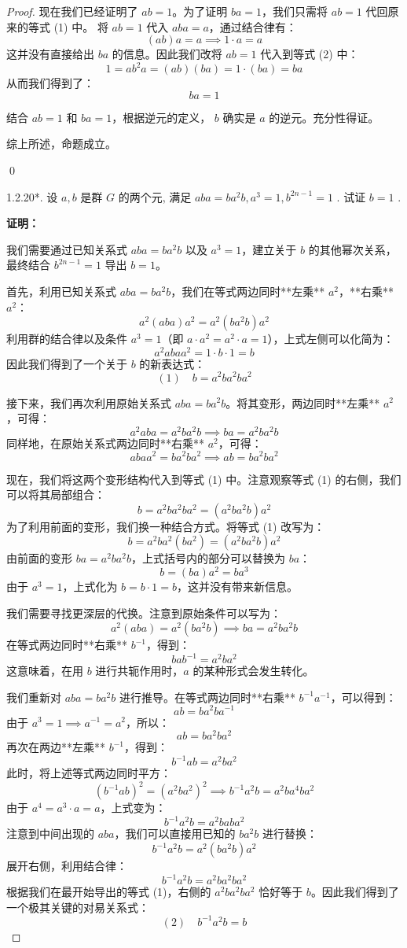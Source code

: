 \documentclass[]{article}
\begin{document}
\begin{proof}
现在我们已经证明了 $ab = 1$。为了证明 $ba = 1$，我们只需将 $ab = 1$ 代回原来的等式 (1) 中。
将 $ab = 1$ 代入 $aba = a$，通过结合律有：
\[ (ab)a = a \implies 1 \cdot a = a \]
这并没有直接给出 $ba$ 的信息。因此我们改将 $ab = 1$ 代入到等式 (2) 中：
\[ 1 = ab^2 a = (ab)(ba) = 1 \cdot (ba) = ba \]
从而我们得到了：
\[ ba = 1 \]

结合 $ab = 1$ 和 $ba = 1$，根据逆元的定义， $b$ 确实是 $a$ 的逆元。充分性得证。

\bigskip
综上所述，命题成立。

\qed

1.2.20*. 设 $a, b$ 是群 $G$ 的两个元, 满足 $aba = ba^2b, a^3 = 1, b^{2n-1} = 1$ . 试证 $b = 1$ . 

\bigskip
\noindent \textbf{证明：} 

我们需要通过已知关系式 $aba = ba^2b$ 以及 $a^3 = 1$，建立关于 $b$ 的其他幂次关系，最终结合 $b^{2n-1} = 1$ 导出 $b = 1$。

首先，利用已知关系式 $aba = ba^2b$，我们在等式两边同时**左乘** $a^2$，**右乘** $a^2$：
\[ a^2 (aba) a^2 = a^2 (ba^2b) a^2 \]
利用群的结合律以及条件 $a^3 = 1$（即 $a \cdot a^2 = a^2 \cdot a = 1$），上式左侧可以化简为：
\[ a^2 a b a a^2 = 1 \cdot b \cdot 1 = b \]
因此我们得到了一个关于 $b$ 的新表达式：
\[ (1) \quad b = a^2 ba^2 b a^2 \]

接下来，我们再次利用原始关系式 $aba = ba^2b$。将其变形，两边同时**左乘** $a^2$，可得：
\[ a^2 aba = a^2 ba^2b \implies ba = a^2 ba^2b \]
同样地，在原始关系式两边同时**右乘** $a^2$，可得：
\[ abaa^2 = ba^2ba^2 \implies ab = ba^2ba^2 \]

现在，我们将这两个变形结构代入到等式 (1) 中。注意观察等式 (1) 的右侧，我们可以将其局部组合：
\[ b = a^2 b a^2 b a^2 = (a^2 b a^2 b) a^2 \]
为了利用前面的变形，我们换一种结合方式。将等式 (1) 改写为：
\[ b = a^2 ba^2 (ba^2) = (a^2 ba^2b) a^2 \]
由前面的变形 $ba = a^2 ba^2b$，上式括号内的部分可以替换为 $ba$：
\[ b = (ba) a^2 = ba^3 \]
由于 $a^3 = 1$，上式化为 $b = b \cdot 1 = b$，这并没有带来新信息。

我们需要寻找更深层的代换。注意到原始条件可以写为：
\[ a^2 (aba) = a^2 (ba^2b) \implies ba = a^2 ba^2b \]
在等式两边同时**右乘** $b^{-1}$，得到：
\[ bab^{-1} = a^2 ba^2 \]
这意味着，在用 $b$ 进行共轭作用时，$a$ 的某种形式会发生转化。

我们重新对 $aba = ba^2b$ 进行推导。在等式两边同时**右乘** $b^{-1}a^{-1}$，可以得到：
\[ ab = ba^2ba^{-1} \]
由于 $a^3 = 1 \implies a^{-1} = a^2$，所以：
\[ ab = ba^2ba^2 \]
再次在两边**左乘** $b^{-1}$，得到：
\[ b^{-1}ab = a^2ba^2 \]
此时，将上述等式两边同时平方：
\[ (b^{-1}ab)^2 = (a^2ba^2)^2 \implies b^{-1}a^2b = a^2ba^4b a^2 \]
由于 $a^4 = a^3 \cdot a = a$，上式变为：
\[ b^{-1}a^2b = a^2bab a^2 \]
注意到中间出现的 $aba$，我们可以直接用已知的 $ba^2b$ 进行替换：
\[ b^{-1}a^2b = a^2 (ba^2b) a^2 \]
展开右侧，利用结合律：
\[ b^{-1}a^2b = a^2 b a^2 b a^2 \]
根据我们在最开始导出的等式 (1)，右侧的 $a^2 b a^2 b a^2$ 恰好等于 $b$。因此我们得到了一个极其关键的对易关系式：
\[ (2) \quad b^{-1}a^2b = b \]


\end{proof}
\end{document}
